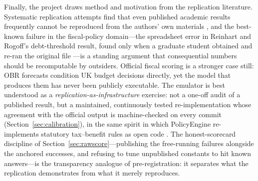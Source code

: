 Finally, the project draws method and motivation from the replication literature. Systematic replication attempts find that even published academic results frequently cannot be reproduced from the authors' own materials \citep{chang2015}, and the best-known failure in the fiscal-policy domain---the spreadsheet error in Reinhart and Rogoff's debt-threshold result, found only when a graduate student obtained and re-ran the original file \citep{herndon2014}---is a standing argument that consequential numbers should be recomputable by outsiders. Official fiscal scoring is a stronger case still: OBR forecasts condition UK budget decisions directly, yet the model that produces them has never been publicly executable. The emulator is best understood as a \emph{replication-as-infrastructure} exercise: not a one-off audit of a published result, but a maintained, continuously tested re-implementation whose agreement with the official output is machine-checked on every commit (Section~\ref{sec:calibration}), in the same spirit in which PolicyEngine re-implements statutory tax--benefit rules as open code \citep{policyengine}. The honest-scorecard discipline of Section~\ref{sec:rawscore}---publishing the free-running failures alongside the anchored successes, and refusing to tune unpublished constants to hit known answers---is the transparency analogue of pre-registration: it separates what the replication demonstrates from what it merely reproduces.

